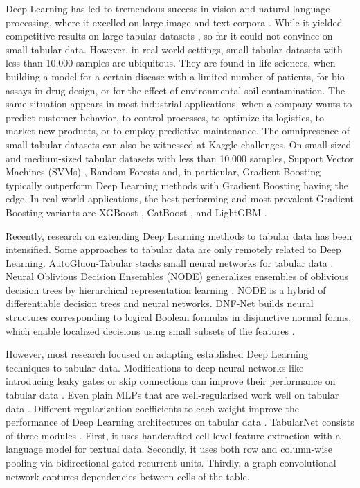\documentclass{article}
\theoremstyle{plain}
\theoremstyle{definition}
\theoremstyle{remark}
\begin{document}
Deep Learning has led to tremendous success
in vision and natural language processing, where it 
excelled on large image and text corpora \citep{LeCun:15,Schmidhuber:15}.
While it yielded competitive results on large tabular datasets \cite{Avati:18,Simm:18,Zhang:19,Mayr:18},
so far it could not convince on small tabular data.
However, in real-world settings, 
small tabular datasets with less than 10,000 samples are ubiquitous.
They are found in life sciences, when building a model for a certain disease
with a limited number of patients,
for bio-assays in drug design, or for the effect of environmental soil contamination.  
The same situation appears in most industrial applications, when
a company wants to predict customer behavior, to control processes, 
to optimize its logistics, to market new products, or to employ predictive maintenance.
The omnipresence of small tabular datasets can also be witnessed at Kaggle challenges.
On small-sized and medium-sized tabular datasets with less than 10,000 samples,
Support Vector Machines (SVMs) \citep{Boser:92,Cortes:95,Scholkopf:02},
Random Forests \citep{Ho:95,Breiman:01} and, in particular,
Gradient Boosting \citep{Friedman:01}
typically outperform Deep Learning methods with 
Gradient Boosting having the edge. 
In real world applications, 
the best performing and most prevalent Gradient Boosting variants are
XGBoost \citep{Chen:16},
CatBoost \citep{Dorogush:17,Prokhorenkova:18}, and
LightGBM \citep{Ke:17}.



Recently, research on extending Deep Learning
methods to tabular data has been intensified.
Some approaches to tabular data
are only remotely related to Deep Learning.
AutoGluon-Tabular stacks small neural networks for tabular
data \citep{Erickson:20}.
Neural Oblivious Decision Ensembles (NODE) generalizes
ensembles of oblivious decision trees by hierarchical representation
learning \citep{Popov:19}.
NODE is a hybrid of 
differentiable decision trees and neural networks.
DNF-Net builds neural structures corresponding to
logical Boolean formulas in disjunctive normal forms,
which enable localized decisions using small subsets of the features \citep{Abutbul:20}.


However, most research focused on adapting established Deep Learning techniques to
tabular data.
Modifications to deep neural networks 
like introducing leaky gates or skip connections
can improve their performance on tabular data \citep{Fiedler:21}. 
Even plain MLPs that are well-regularized work well on tabular data \citep{Kadra:21}.
Different regularization coefficients to each weight improve
the performance of Deep Learning architectures on tabular data \citep{Shavitt:18}.
TabularNet consists of three modules \citep{Du:21}.
First, it uses handcrafted cell-level feature extraction
with a language model for textual data.
Secondly, it uses both row and column-wise
pooling via bidirectional gated recurrent units.
Thirdly, a graph convolutional network captures
dependencies between cells of the table.
\end{document}
